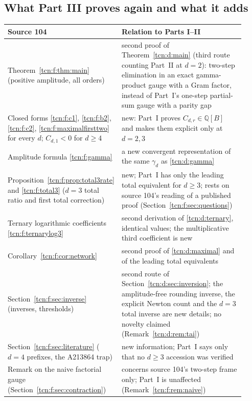 \documentclass[11pt,letterpaper]{article}
\newcommand{\Q}{\mathbb Q}
\theoremstyle{remark}
\begin{document}
\subsection{What Part III proves again and what it adds}\label{tcn:f:sec:map}
\begin{center}\small
\begin{tabular}{@{}>{\raggedright}p{0.4\linewidth}>{\raggedright\arraybackslash}p{0.52\linewidth}@{}}
\toprule
Source 104 & Relation to Parts I--II\\
\midrule
Theorem~\ref{tcn:f:thm:main} (positive amplitude, all orders) & second proof of Theorem~\ref{tcn:d:main} (third route counting Part~II at $d=2$): two-step elimination in an exact gamma-product gauge with a Gram factor, instead of Part~I's one-step partial-sum gauge with a parity gap\\
Closed forms \eqref{tcn:f:c1}, \eqref{tcn:f:b2}, \eqref{tcn:f:c2}, \eqref{tcn:f:maximalfirsttwo} for every $d$; $C_{d,1}<0$ for $d\ge4$ & new: Part~I proves $C_{d,r}\in\Q[B]$ and makes them explicit only at $d=2,3$\\
Amplitude formula \eqref{tcn:f:gamma} & a new convergent representation of the same $\gamma_d$ as \eqref{tcn:d:gamma}\\
Proposition~\ref{tcn:f:prop:total3rate} and \eqref{tcn:f:total3} ($d=3$ total ratio and first total correction) & new; Part~I has only the leading total equivalent for $d\ge3$; rests on source 104's reading of a published proof (Section~\ref{tcn:f:sec:questions})\\
Ternary logarithmic coefficients \eqref{tcn:f:ternarylog3} & second derivation of \eqref{tcn:d:ternary}, identical values; the multiplicative third coefficient is new\\
Corollary~\ref{tcn:f:cor:network} & second proof of \eqref{tcn:d:maximal} and of the leading total equivalents\\
Section~\ref{tcn:f:sec:inverse} (inverses, thresholds) & second route of Section~\ref{tcn:d:sec:inversion}; the amplitude-free rounding inverse, the explicit Newton count and the $d=3$ total inverse are new details; no novelty claimed (Remark~\ref{tcn:d:rem:tai})\\
Section~\ref{tcn:f:sec:literature} ($d=4$ prefixes, the A213864 trap) & new information; Part~I says only that no $d\ge3$ accession was verified\\
Remark on the naive factorial gauge (Section~\ref{tcn:f:sec:contraction}) & concerns source 104's two-step frame only; Part~I is unaffected (Remark~\ref{tcn:f:rem:naive})\\
\bottomrule
\end{tabular}
\end{center}
\end{document}

